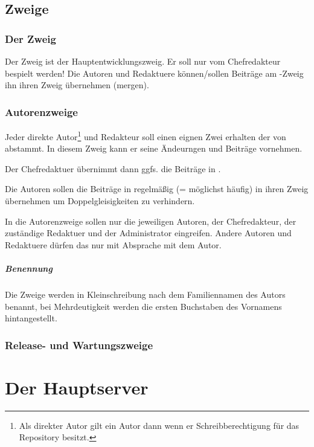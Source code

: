 \documentclass[ngerman,paper=a4,fontsize=8pt,headings=small,draft=no,parskip=half,noonelinecaption]{scrreprt}
\begin{document}
\subsection{Zweige}

\subsubsection{Der Zweig }

Der Zweig  ist der Hauptentwicklungszweig. Er soll nur vom
Chefredakteur bespielt werden! Die Autoren und Redaktuere können/sollen
Beiträge am -Zweig ihn ihren Zweig übernehmen (mergen).


\subsubsection{Autorenzweige}

Jeder direkte Autor\footnote{Als direkter Autor gilt ein Autor dann wenn er
Schreibberechtigung für das Repository besitzt.} und Redakteur soll einen
eignen Zwei erhalten der von  abstammt. In diesem Zweig kann er
seine Ändeurngen und Beiträge vornehmen. 

Der Chefredaktuer übernimmt dann ggfs. die Beiträge in . 

Die Autoren sollen die Beiträge in  regelmäßig (= möglichst
häufig) in ihren Zweig übernehmen um Doppelgleisigkeiten zu verhindern. 

In die Autorenzweige sollen nur die jeweiligen Autoren, der Chefredakteur, der
zuständige Redaktuer und der Administrator eingreifen. Andere Autoren und
Redaktuere dürfen das nur mit Absprache mit dem Autor. 

\subparagraph{Benennung} Die Zweige werden in Kleinschreibung nach dem
Familiennamen des Autors benannt, bei Mehrdeutigkeit werden die ersten Buchstaben des Vornamens
hintangestellt. 

\subsubsection{Release- und Wartungszweige}



\section{Der Hauptserver}
\end{document}
